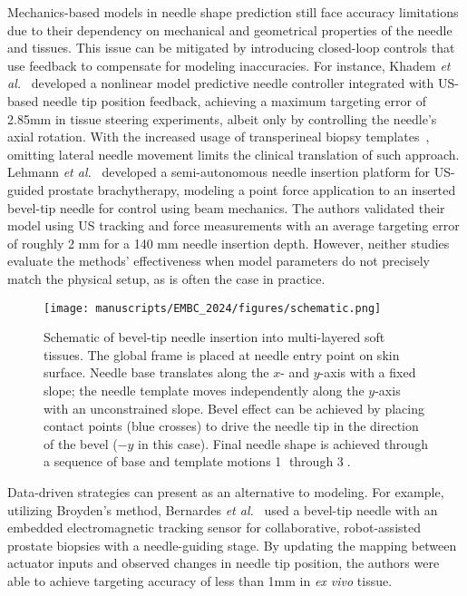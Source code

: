 Mechanics-based models in needle shape prediction still face accuracy limitations due to their dependency on mechanical and geometrical properties of the needle and tissues. This issue can be mitigated by introducing closed-loop controls that use feedback to compensate for modeling inaccuracies. For instance, Khadem \textit{et al.}~\parencite{khademUltrasoundGuidedModelPredictive2016} developed a nonlinear model predictive needle controller integrated with US-based needle tip position feedback, achieving a maximum targeting error of 2.85mm in tissue steering experiments, albeit only by controlling the needle's axial rotation. With the increased usage of transperineal biopsy templates~\parencite{abdulmajedRoleTransperinealTemplate2015}, omitting lateral needle movement limits the clinical translation of such approach. Lehmann \textit{et al.}~\parencite{lehmannDeflectionModelingNeedle2017} developed a semi-autonomous needle insertion platform for US-guided prostate brachytherapy, modeling a point force application to an inserted bevel-tip needle for control using beam mechanics. The authors validated their model using US tracking and force measurements with an average targeting error of roughly 2 mm for a 140 mm needle insertion depth. However, neither studies~\parencite{lehmannDeflectionModelingNeedle2017,khademUltrasoundGuidedModelPredictive2016} evaluate the methods' effectiveness when model parameters do not precisely match the physical setup, as is often the case in practice.

\begin{figure}[t]
  \centering
  \texttt{[image: manuscripts/EMBC\_2024/figures/schematic.png]}
  \caption{Schematic of bevel-tip needle insertion into multi-layered soft tissues. The global frame is placed at needle entry point on skin surface. Needle base translates along the $x$- and $y$-axis with a fixed slope; the needle template moves independently along the $y$-axis with an unconstrained slope. Bevel effect can be achieved by placing contact points (blue crosses) to drive the needle tip in the direction of the bevel ($-y$ in this case). Final needle shape is achieved through a sequence of base and template motions \textcircled{1} through \textcircled{3}.}
  \label{fig:chap-4-schematic}
\end{figure}

Data-driven strategies can present as an alternative to modeling. For example, utilizing Broyden's method, Bernardes \textit{et al.}~\parencite{bernardesDatadrivenAdaptiveNeedle2023} used a bevel-tip needle with an embedded electromagnetic tracking sensor for collaborative, robot-assisted prostate biopsies with a needle-guiding stage. By updating the mapping between actuator inputs and observed changes in needle tip position, the authors were able to achieve targeting accuracy of less than 1mm in \textit{ex vivo} tissue.

